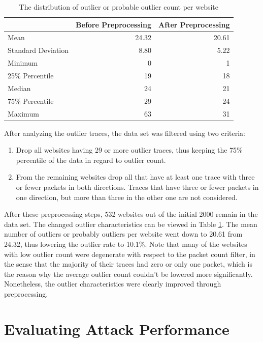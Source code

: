 \documentclass[
	ruledheaders=chapter,
	class=report,
	thesis={type=master, department=inf},
	accentcolor=1c,
	custommargins=true,
	marginpar=false,
	parskip=half-,
	fontsize=11pt,
]{tudapub}
\begin{document}
	\begin{table}
		\centering
		\begin{tabular}{lrr}
			\toprule & \textbf{Before Preprocessing} & \textbf{After Preprocessing} \\
			\midrule Mean & 24.32 & 20.61 \\
			Standard Deviation & 8.80 & 5.22 \\
			Minimum & 0 & 1\\
			25\% Percentile & 19 & 18 \\
			Median & 24 & 21 \\
			75\% Percentile & 29 & 24 \\
			Maximum & 63 & 31\\
			\bottomrule
		\end{tabular}
		\caption{The distribution of outlier or probable outlier count per website}
		\label{tbl:outlier_dist}
	\end{table}

	After analyzing the outlier traces, the data set was filtered using two criteria:
	
	\begin{enumerate}
		\item Drop all websites having 29 or more outlier traces, thus keeping the 75\% percentile of the data in regard to outlier count.
		\item From the remaining websites drop all that have at least one trace with three or fewer packets in both directions. Traces that have three or fewer packets in one direction, but more than three in the other one are not considered.
	\end{enumerate}

	After these preprocessing steps, 532 websites out of the initial 2000 remain in the data set. The changed outlier characteristics can be viewed in Table \ref{tbl:outlier_dist}. The mean number of outliers or probably outliers per website went down to 20.61 from 24.32, thus lowering the outlier rate to 10.1\%. Note that many of the websites with low outlier count were degenerate with respect to the packet count filter, in the sense that the majority of their traces had zero or only one packet, which is the reason why the average outlier count couldn't be lowered more significantly. Nonetheless, the outlier characteristics were clearly improved through preprocessing.

	\section{Evaluating Attack Performance}
	\label{pipeline}
	
\end{document}

